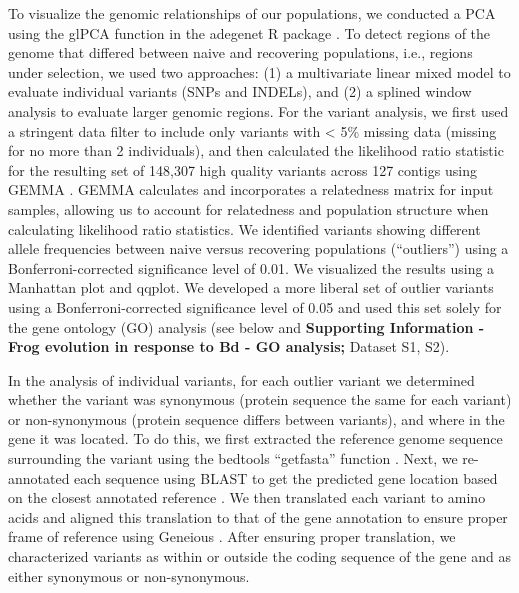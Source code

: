 \documentclass[
  letterpaper,
  DIV=11,
  numbers=noendperiod]{scrartcl}
\begin{document}
To visualize the genomic relationships of our populations, we conducted
a PCA using the glPCA function in the adegenet R package
\citep{jombart2008}. To detect regions of the genome that differed
between naive and recovering populations, i.e., regions under selection,
we used two approaches: (1) a multivariate linear mixed model to
evaluate individual variants (SNPs and INDELs), and (2) a splined window
analysis to evaluate larger genomic regions. For the variant analysis,
we first used a stringent data filter to include only variants with
\textless{} 5\% missing data (missing for no more than 2 individuals),
and then calculated the likelihood ratio statistic for the resulting set
of 148,307 high quality variants across 127 contigs using GEMMA
\citep{zhou2014}. GEMMA calculates and incorporates a relatedness matrix
for input samples, allowing us to account for relatedness and population
structure when calculating likelihood ratio statistics. We identified
variants showing different allele frequencies between naive versus
recovering populations (``outliers'') using a Bonferroni-corrected
significance level of 0.01. We visualized the results using a Manhattan
plot and qqplot. We developed a more liberal set of outlier variants
using a Bonferroni-corrected significance level of 0.05 and used this
set solely for the gene ontology (GO) analysis (see below and
\textbf{Supporting Information - Frog evolution in response to Bd - GO
analysis;} Dataset S1, S2).

In the analysis of individual variants, for each outlier variant we
determined whether the variant was synonymous (protein sequence the same
for each variant) or non-synonymous (protein sequence differs between
variants), and where in the gene it was located. To do this, we first
extracted the reference genome sequence surrounding the variant using
the bedtools ``getfasta'' function \citep{quinlan2010}. Next, we
re-annotated each sequence using BLAST to get the predicted gene
location based on the closest annotated reference \citep{altschul1997}.
We then translated each variant to amino acids and aligned this
translation to that of the gene annotation to ensure proper frame of
reference using Geneious \citep{kearse2012}. After ensuring proper
translation, we characterized variants as within or outside the coding
sequence of the gene and as either synonymous or non-synonymous.
\end{document}
